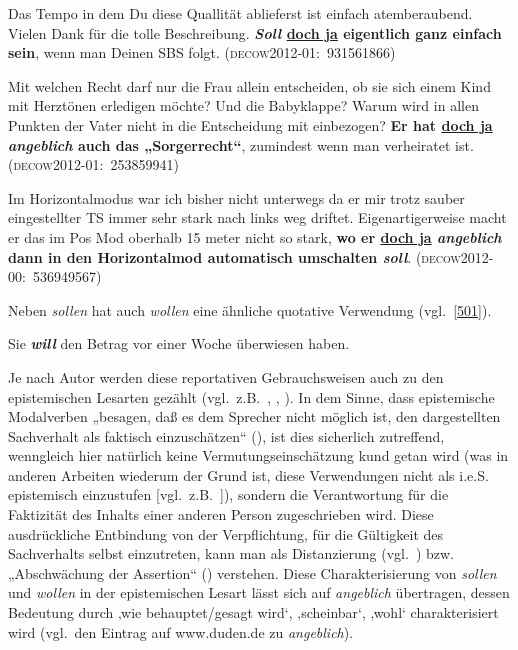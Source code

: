 \begin{exe}
	\ex\label{498} 

	Das Tempo in dem Du diese Quallität ablieferst ist einfach atemberaubend. Vielen Dank für die tolle Beschreibung. \textbf{\textit{Soll} 					\underline{doch ja} eigentlich ganz einfach sein}, wenn man Deinen SBS folgt.  
	\newline\hbox{}\hfill\hbox{\scshape(decow2012-01: 931561866)}	
\end{exe}

\begin{exe}
	\ex\label{499} 

	Mit welchen Recht darf nur die Frau allein entscheiden, ob sie sich einem Kind mit Herztönen erledigen möchte? Und die Babyklappe? Warum wird in allen 	Punkten der Vater nicht in die Entscheidung mit einbezogen? \textbf{Er hat \underline{doch ja} \textit{angeblich} auch das „Sorgerrecht“}, 		zumindest wenn man verheiratet ist.
	\hfill\hbox{\scshape(decow2012-01: 253859941)}	
\end{exe}
												                    
\begin{exe}
	\ex\label{500} 

	Im Horizontalmodus war ich bisher nicht unterwegs da er mir trotz sauber eingestellter TS immer sehr stark nach links weg driftet. Eigenartigerweise 		macht er das im Pos Mod oberhalb 15 meter nicht so stark, \textbf{wo er \underline{doch ja} \textit{angeblich} dann in den Horizontalmod automatisch 		umschalten \textit{soll}}. 	
	\hfill\hbox{\scshape(decow2012-00: 536949567)}	
\end{exe}		      								   				  
Neben \textit{sollen} hat auch \textit{wollen} eine ähnliche quotative Verwendung (vgl.\ \ref{501}).

\begin{exe}
	\ex\label{501} 
	Sie \textbf{\textit{will}} den Betrag vor einer Woche überwiesen haben.
\end{exe}	
Je nach Autor werden diese reportativen Gebrauchsweisen auch zu den epistemischen Lesarten  gezählt (vgl.\ z.B.\ \citealt[235]{Oehlschlaeger1989}, \citealt[218, 119--220]{Diewald1993}, \citealt[20]{Heine1995}). In dem Sinne, dass epistemische Modalverben „besagen, daß es dem Sprecher nicht möglich ist, den dargestellten Sachverhalt als faktisch einzuschätzen“ (\citealt[221]{Diewald1993}), ist dies sicherlich zutreffend, wenn\-gleich hier natürlich keine Vermutungseinschätzung kund getan wird (was in anderen Arbeiten wiederum der Grund ist, diese Verwendungen nicht als i.e.S. epistemisch einzustufen [vgl.\ z.B.\ \citealt[41]{Mache2009}]), sondern die Verantwortung für die Faktizität des Inhalts einer anderen Person zugeschrieben wird. Diese ausdrückliche Entbindung von der Verpflichtung, für die Gültigkeit des Sachverhalts selbst einzutreten, kann man als Distanzierung (vgl.\ \citealt[49]{Bruenner1983}) bzw. „Abschwächung der Assertion“ (\citealt[103]{Glas1984}) verstehen. Diese Charakterisierung von \textit{sollen} und \textit{wollen} in der epistemischen Lesart lässt sich auf \textit{angeblich} übertragen, dessen Bedeutung durch ‚wie behauptet\slash gesagt wird‘, ‚scheinbar‘, ‚wohl‘ charakterisiert wird (vgl.\ den Eintrag auf www.duden.de zu \textit{angeblich}). 

